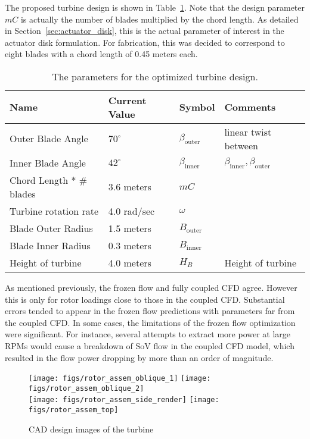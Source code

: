 The proposed turbine design is shown in Table~\ref{tab:turbine}. Note
that the design parameter $mC $ is actually the number of blades
multiplied by the chord length. As detailed in
Section~\ref{sec:actuator_disk}, this is the actual parameter of
interest in the actuator disk formulation. For fabrication, this was 
decided to correspond to eight blades with a chord length of 0.45 meters
each. %

\begin{table}[]
\centering
 \caption{The parameters for the optimized turbine design.}
\begin{tabular}{l|l|l|l}
Name                & Current Value    & Symbol           & Comments \\
 \hline
Outer Blade Angle & $70^{\circ}$ & $\beta_{\text{outer}}$  & linear twist between \\
Inner Blade Angle & $42^{\circ}$ & $\beta_\text{inner}$    & 
	     $\beta_\text{inner},\beta_\text{outer}$ \\ 
Chord Length * \# blades   & 3.6 meters  & $mC $ &  \\
Turbine rotation rate & 4.0 rad/sec  & $\omega$         &  \\
Blade Outer Radius  & 1.5 meters   & $B_\text{outer}$ &  \\
Blade Inner Radius  & 0.3 meters   & $B_\text{inner}$ &  \\
Height of turbine   & 4.0 meters   & $H_B$            & Height of turbine \\
\hline
\end{tabular}
 \label{tab:turbine}
\end{table}

As mentioned previously, the frozen flow and fully coupled CFD
agree. However this is only for rotor loadings close to those in the
coupled CFD. Substantial errors tended to appear in the frozen flow
predictions with parameters far from the coupled CFD. In some cases, the
limitations of the frozen flow optimization were significant. For
instance, several attempts to extract more power at large RPMs would
cause a breakdown of SoV flow in the coupled CFD model, which resulted
in the flow power dropping by more than an order of magnitude. 

  \begin{figure}
   \centering
   \texttt{[image: figs/rotor\_assem\_oblique\_1]}
   \hfill
   \texttt{[image: figs/rotor\_assem\_oblique\_2]}
   \\
   \vspace{1em}
   \texttt{[image: figs/rotor\_assem\_side\_render]}
   \hfill
   \texttt{[image: figs/rotor\_assem\_top]}
   \\   
   \caption{CAD design images of the turbine} 
   \label{fig:cad_turbine}
  \end{figure}


